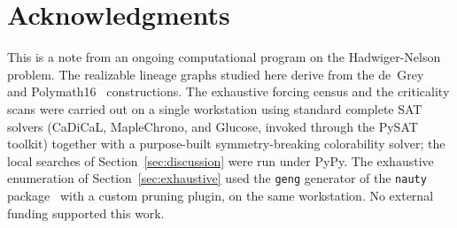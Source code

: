 \documentclass[11pt]{article}
\theoremstyle{definition}
\begin{document}
\section*{Acknowledgments}
This is a note from an ongoing computational program on the Hadwiger-Nelson
problem. The realizable lineage graphs studied here derive from the
de~Grey~\cite{deGrey2018} and Polymath16~\cite{Polymath16} constructions. The
exhaustive forcing census and the criticality scans were carried out on a single
workstation using standard complete SAT solvers (CaDiCaL, MapleChrono, and
Glucose, invoked through the PySAT toolkit) together with a purpose-built
symmetry-breaking colorability solver; the local searches of
Section~\ref{sec:discussion} were run under PyPy. The exhaustive enumeration of
Section~\ref{sec:exhaustive} used the \texttt{geng} generator of the
\texttt{nauty} package~\cite{McKayPiperno2014} with a custom pruning plugin, on
the same workstation. No external funding supported this work.



\end{document}
